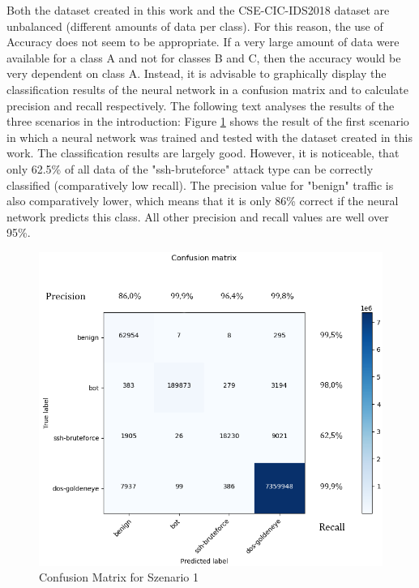 \documentclass[conference]{IEEEtran}
\begin{document}
Both the dataset created in this work and the CSE-CIC-IDS2018 dataset \cite{max2} are unbalanced (different amounts of data per class). For this reason, the use of Accuracy does not seem to be appropriate. If a very large amount of data were available for a class A and not for classes B and C, then the accuracy would be very dependent on class A. Instead, it is advisable to graphically display the classification results of the neural network in a confusion matrix and to calculate precision and recall respectively. The following text analyses the results of the three scenarios in the introduction:
Figure  \ref{fig:cm1} shows the result of the first scenario in which a neural network was trained and tested with the dataset created in this work. The classification results are largely good. However, it is noticeable, that only 62.5\% of all data of the "ssh-bruteforce" attack type can be correctly classified (comparatively low recall). The precision value for "benign" traffic is also comparatively lower, which means that it is only 86\% correct if the neural network predicts this class. All other precision and recall values are well over 95\%.

\begin{figure}[htbp]  
\centerline{\includegraphics[scale=0.65]{NeuesModellNeueDaten.png}}
\caption{Confusion Matrix for Szenario 1}
\label{fig:cm1}
\end{figure}
\end{document}
